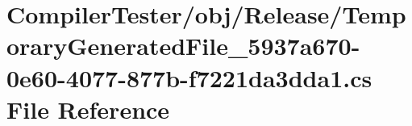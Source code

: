\hypertarget{_compiler_tester_2obj_2_release_2_temporary_generated_file__5937a670-0e60-4077-877b-f7221da3dda1_8cs}{}\section{Compiler\+Tester/obj/\+Release/\+Temporary\+Generated\+File\+\_\+5937a670-\/0e60-\/4077-\/877b-\/f7221da3dda1.cs File Reference}
\label{_compiler_tester_2obj_2_release_2_temporary_generated_file__5937a670-0e60-4077-877b-f7221da3dda1_8cs}
